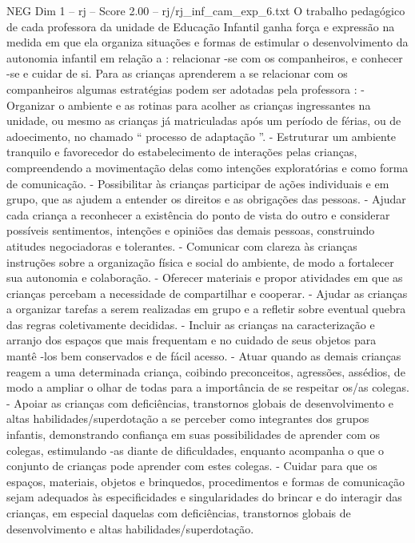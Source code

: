 \begin{textsample}{NEG Dim 1 – rj – Score 2.00 – rj/rj\_inf\_cam\_exp\_6.txt}  \label{ex:f1_neg_001}
O trabalho pedagógico de cada professora da unidade de Educação Infantil ganha força e expressão na medida em que ela organiza situações e formas de estimular o desenvolvimento da autonomia infantil em relação a : relacionar -se com os companheiros, e conhecer -se e cuidar de si.
Para as crianças aprenderem a se relacionar com os companheiros algumas estratégias podem ser adotadas pela professora : - Organizar o ambiente e as rotinas para acolher as crianças ingressantes na unidade, ou mesmo as crianças já matriculadas após um período de férias, ou de adoecimento, no chamado “ processo de adaptação ”. - Estruturar um ambiente tranquilo e favorecedor do estabelecimento de interações pelas crianças, compreendendo a movimentação delas como intenções exploratórias e como forma de comunicação. - Possibilitar às crianças participar de ações individuais e em grupo, que as ajudem a entender os direitos e as obrigações das pessoas. - Ajudar cada criança a reconhecer a existência do ponto de vista do outro e considerar possíveis sentimentos, intenções e opiniões das demais pessoas, construindo atitudes negociadoras e tolerantes. - Comunicar com clareza às crianças instruções sobre a organização física e social do ambiente, de modo a fortalecer sua autonomia e colaboração. - Oferecer materiais e propor atividades em que as crianças percebam a necessidade de compartilhar e cooperar. - Ajudar as crianças a organizar tarefas a serem realizadas em grupo e a refletir sobre eventual quebra das regras coletivamente decididas. - Incluir as crianças na caracterização e arranjo dos espaços que mais frequentam e no cuidado de seus objetos para mantê -los bem conservados e de fácil acesso. - Atuar quando as demais crianças reagem a uma determinada criança, coibindo preconceitos, agressões, assédios, de modo a ampliar o olhar de todas para a importância de se respeitar os/as colegas. - Apoiar as crianças com deficiências, transtornos globais de desenvolvimento e altas habilidades/superdotação a se perceber como integrantes dos grupos infantis, demonstrando confiança em suas possibilidades de aprender com os colegas, estimulando -as diante de dificuldades, enquanto acompanha o que o conjunto de crianças pode aprender com estes colegas. - Cuidar para que os espaços, materiais, objetos e brinquedos, procedimentos e formas de comunicação sejam adequados às especificidades e singularidades do brincar e do interagir das crianças, em especial daquelas com deficiências, transtornos globais de desenvolvimento e altas habilidades/superdotação.

\end{textsample}
